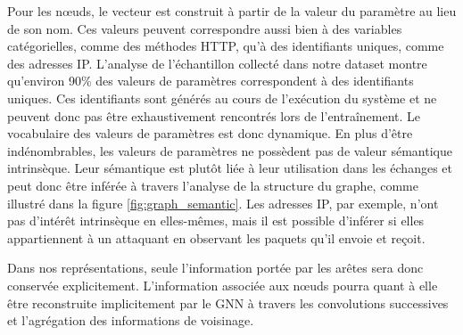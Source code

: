 \documentclass[a4paper,11pt,twoside]{StyleThese}
\begin{document}
Pour les nœuds, le vecteur est construit à partir de la valeur du paramètre au lieu de son nom. Ces valeurs peuvent correspondre aussi bien à des variables catégorielles, comme des méthodes HTTP, qu’à des identifiants uniques, comme des adresses IP. L’analyse de l’échantillon collecté dans notre dataset montre qu’environ 90\% des valeurs de paramètres correspondent à des identifiants uniques. Ces identifiants sont générés au cours de l’exécution du système et ne peuvent donc pas être exhaustivement rencontrés lors de l’entraînement. Le vocabulaire des valeurs de paramètres est donc dynamique. En plus d’être indénombrables, les valeurs de paramètres ne possèdent pas de valeur sémantique intrinsèque. Leur sémantique est plutôt liée à leur utilisation dans les échanges et peut donc être inférée à travers l’analyse de la structure du graphe, comme illustré dans la figure \ref{fig:graph_semantic}. Les adresses IP, par exemple, n’ont pas d’intérêt intrinsèque en elles-mêmes, mais il est possible d’inférer si elles appartiennent à un attaquant en observant les paquets qu’il envoie et reçoit.


Dans nos représentations, seule l’information portée par les arêtes sera donc conservée explicitement. L’information associée aux nœuds pourra quant à elle être reconstruite implicitement par le GNN à travers les convolutions successives et l’agrégation des informations de voisinage.

\end{document}
